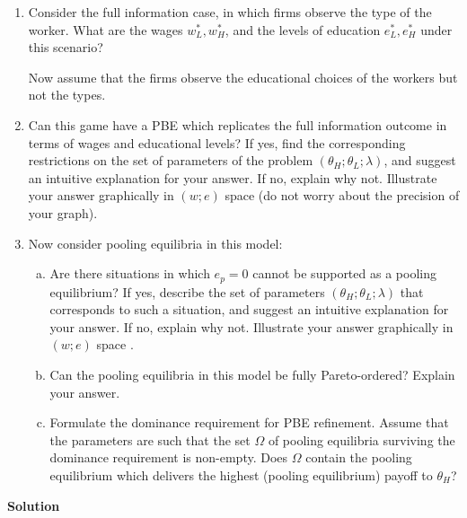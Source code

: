 \documentclass[a4paper]{article}
\begin{document}
\begin{enumerate}
\item Consider the full information case, in which firms observe the type of the worker. What are the wages $w^*_L, w^*_H$, and the levels of education $e^*_L, e^*_H$ under this scenario?


Now assume that the firms observe the educational choices of the workers but not the
types.
\item  Can this game have a PBE which replicates the full information outcome in terms of
wages and educational levels? If yes, find the corresponding restrictions on the set
of parameters of the problem $(\theta_H; \theta_L; \lambda)$, and suggest an intuitive explanation for
your answer. If no, explain why not. Illustrate your answer graphically in $(w; e)$
space (do not worry about the precision of your graph).
\item Now consider pooling equilibria in this model:
\begin{enumerate}[(a)]
\item Are there situations in which $e_p = 0$ cannot be supported as a pooling equilibrium? If yes, describe the set of parameters $(\theta_H; \theta_L; \lambda)$ that corresponds to such a situation, and suggest an intuitive explanation for your answer. If no,
explain why not. Illustrate your answer graphically in $(w; e)$ space .
\item Can the pooling equilibria in this model be fully Pareto-ordered? Explain your
answer.
\item Formulate the dominance requirement
for PBE refinement. Assume that
the parameters are such that the set $\Omega$
of pooling equilibria surviving the
dominance requirement is non-empty. Does $\Omega$
contain the pooling equilibrium
which delivers the highest (pooling equilibrium) payoff to $\theta_H$?
\end{enumerate}
\end{enumerate}


\textbf{Solution}
\end{document}
